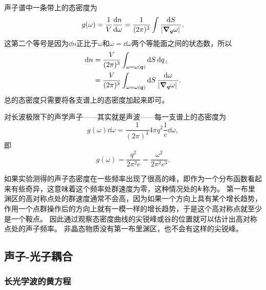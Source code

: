 声子谱中一条带上的态密度为
\begin{equation}
    g(\omega) = \frac{1}{V} \dv{n}{\omega} = \frac{1}{(2\pi)^3} \int \frac{\dd{S}}{\abs*{\grad_{\vb*{q}} \omega}}.
\end{equation}
这第二个等号是因为$\dd{n}$正比于$\omega$和$\omega = \dd{\omega}$两个等能面之间的状态数，所以
\[
    \begin{aligned}
        \dd{n} &= \frac{V}{(2\pi)^3} \int_{\omega=\omega(\vb*{q})} \dd{S} \dd{q_\bot} \\
        &= \frac{V}{(2\pi)^3} \int_{\omega=\omega(\vb*{q})} \dd{S} \frac{\dd{\omega}}{\abs*{\grad_{\vb*{q}} \omega}}.
    \end{aligned}
\]
总的态密度只需要将各支谱上的态密度加起来即可。

对长波极限下的声学声子——其实就是声波——每一支谱上的态密度为
\[
    g(\omega) \dd{\omega} = \frac{1}{(2\pi)^3} 4\pi q^2 \frac{1}{c} \dd{\omega},
\]
即
\begin{equation}
    g(\omega) = \frac{q^2}{2\pi^2 c} = \frac{\omega^2}{2\pi^2 c^3}.
\end{equation}

如果实验测得的声子态密度在一些频率出现了很高的峰，即作为一个分布函数看起来有些奇异，这意味着这个频率处群速度为零，这种情况处的$\vb*{k}$称为。
第一布里渊区的高对称点处的群速度通常不会高，因为如果一个方向上具有某个增长趋势，作用一个点群操作后的方向上就有一模一样的增长趋势，于是这个高对称点就至少是一个鞍点。
因此通过观察态密度曲线的尖锐峰或谷的位置就可以估计出高对称点处的声子频率。
非晶态物质没有第一布里渊区，也不会有这样的尖锐峰。

\subsection{声子-光子耦合}

\subsubsection{长光学波的黄方程}\label{sec:huang-eq}

